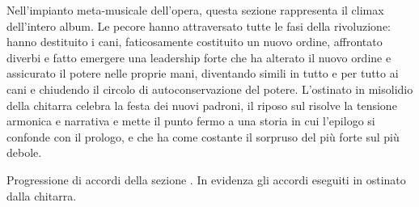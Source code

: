 \documentclass[class=book, crop=false, oneside, 12pt]{standalone}
\begin{document}
    Nell'impianto meta-musicale dell'opera, questa sezione rappresenta il climax dell'intero album. Le pecore hanno attraversato tutte le fasi della rivoluzione: hanno destituito i cani, faticosamente costituito un nuovo ordine, affrontato diverbi e fatto emergere una leadership forte che ha alterato il nuovo ordine e assicurato il potere nelle proprie mani, diventando simili in tutto e per tutto ai cani e chiudendo il circolo di autoconservazione del potere. L'ostinato in misolidio della chitarra celebra la festa dei nuovi padroni, il riposo sul  risolve la tensione armonica e narrativa e mette il punto fermo a una storia in cui l'epilogo si confonde con il prologo, e che ha come costante il sorpruso del più forte sul più debole.
    
    \begin{sheet}[htb]
        \centering
        \caption[Progressione di accordi della sezione .]{Progressione di accordi della sezione . In evidenza gli accordi eseguiti in ostinato dalla chitarra.}
        \label{sheet:sheep-guitar_out_chords}
    \end{sheet}
    
\end{document}
